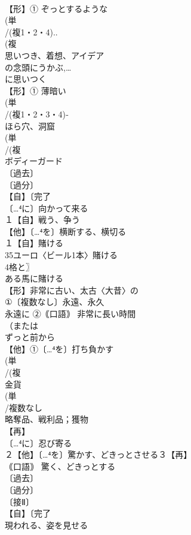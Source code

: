 \documentclass[8pt]{extreport}
\begin{document}
\begin{CJK}{UTF8}{min}
\\	【形】① ぞっとするような 
\\	(単
\\	/(複1・2・4)..
\\	(複
\\	思いつき、着想、アイデア 
\\	の念頭にうかぶ,…
\\	に思いつく
\\	【形】① 薄暗い
\\	(単
\\	/(複1・2・3・4)‐
\\	ほら穴、洞窟 
\\	(単
\\	/(複
\\	ボディーガード 
\\	〔過去〕
\\	〔過分〕
\\	【自】〔完了
\\	〔…⁴に〕向かって来る
\\	１【自】戦う、争う 
\\	【他】〔…⁴を〕横断する、横切る 
\\	１【自】賭ける 
\\	35ユーロ〈ビール1本〉賭ける 
\\	4格と〗
\\	ある馬に賭ける
\\	【形】非常に古い、太古〈大昔〉の
\\	①〔複数なし〕永遠、永久 
\\	永遠に ②｟口語｠ 非常に長い時間 
\\	（または
\\	ずっと前から
\\	【他】①〔…⁴を〕打ち負かす 
\\	(単
\\	/(複
\\	金貨 
\\	(単
\\	/複数なし 
\\	略奪品、戦利品；獲物
\\	【再】
\\	〔…⁴に〕忍び寄る 
\\	２【他】〔…⁴を〕驚かす、どきっとさせる３【再】
\\	｟口語｠ 驚く、どきっとする 
\\	〔過去〕
\\	〔過分〕
\\	〔接Ⅱ〕
\\	【自】〔完了
\\	現われる、姿を見せる 

\end{CJK}
\end{document}
